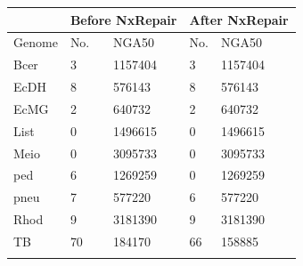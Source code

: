 \documentclass{bioinfo}
\begin{document}
\begin{table}[!t]
{\begin{tabular}{lllllll}\toprule
 & \multicolumn{2}{l}{Before NxRepair} & \multicolumn{4}{l}{After NxRepair} \\\midrule
Genome & No. & NGA50 & No. & NGA50 \\\midrule
Bcer & 3 & 1157404 & 3 & 1157404 \\
EcDH & 8 & 576143 & 8 & 576143 \\
EcMG & 2 & 640732 & 2 & 640732 \\
List & 0 & 1496615 & 0 & 1496615 \\
Meio & 0 & 3095733 & 0 & 3095733 \\
ped & 6 & 1269259 & 0 & 1269259 \\
pneu & 7 & 577220 & 6 & 577220 \\
Rhod & 9 & 3181390 & 9 & 3181390 \\
TB & 70 & 184170 & 66 & 158885 \\\botrule
\end{tabular}}{}
\end{table}
\end{document}

